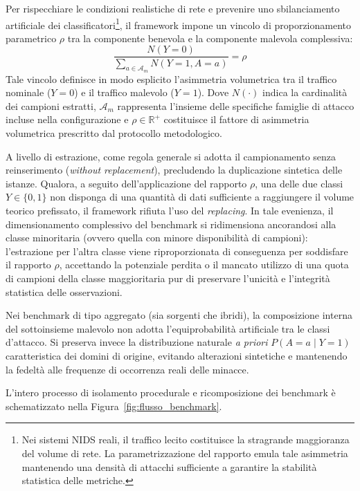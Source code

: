 Per rispecchiare le condizioni realistiche di rete e prevenire uno sbilanciamento artificiale dei classificatori\footnote{Nei sistemi NIDS reali, il traffico lecito costituisce la stragrande maggioranza del volume di rete. La parametrizzazione del rapporto emula tale asimmetria mantenendo una densità di attacchi sufficiente a garantire la stabilità statistica delle metriche.}, il framework impone un vincolo di proporzionamento parametrico $\rho$ tra la componente benevola e la componente malevola complessiva:
\begin{equation}
    \frac{N(Y = 0)}{\sum_{a \in \mathcal{A}_m} N(Y = 1, A = a)} = \rho
    \label{eq:rho_constraint}
\end{equation}
Tale vincolo definisce in modo esplicito l'asimmetria volumetrica tra il traffico nominale ($Y = 0$) e il traffico malevolo ($Y = 1$). Dove $N(\cdot)$ indica la cardinalità dei campioni estratti, $\mathcal{A}_m$ rappresenta l'insieme delle specifiche famiglie di attacco incluse nella configurazione e $\rho \in \mathbb{R}^+$ costituisce il fattore di asimmetria volumetrica prescritto dal protocollo metodologico.

A livello di estrazione, come regola generale si adotta il campionamento senza reinserimento (\textit{without replacement}), precludendo la duplicazione sintetica delle istanze. Qualora, a seguito dell'applicazione del rapporto $\rho$, una delle due classi $Y \in \{0, 1\}$ non disponga di una quantità di dati sufficiente a raggiungere il volume teorico prefissato, il framework rifiuta l'uso del \textit{replacing}. In tale evenienza, il dimensionamento complessivo del benchmark si ridimensiona ancorandosi alla classe minoritaria (ovvero quella con minore disponibilità di campioni): l'estrazione per l'altra classe viene riproporzionata di conseguenza per soddisfare il rapporto $\rho$, accettando la potenziale perdita o il mancato utilizzo di una quota di campioni della classe maggioritaria pur di preservare l'unicità e l'integrità statistica delle osservazioni.

Nei benchmark di tipo aggregato (sia sorgenti che ibridi), la composizione interna del sottoinsieme malevolo non adotta l'equiprobabilità artificiale tra le classi d'attacco. Si preserva invece la distribuzione naturale \textit{a priori} $P(A = a \mid Y = 1)$ caratteristica dei domini di origine, evitando alterazioni sintetiche e mantenendo la fedeltà alle frequenze di occorrenza reali delle minacce.

L'intero processo di isolamento procedurale e ricomposizione dei benchmark è schematizzato nella Figura~\ref{fig:flusso_benchmark}.

